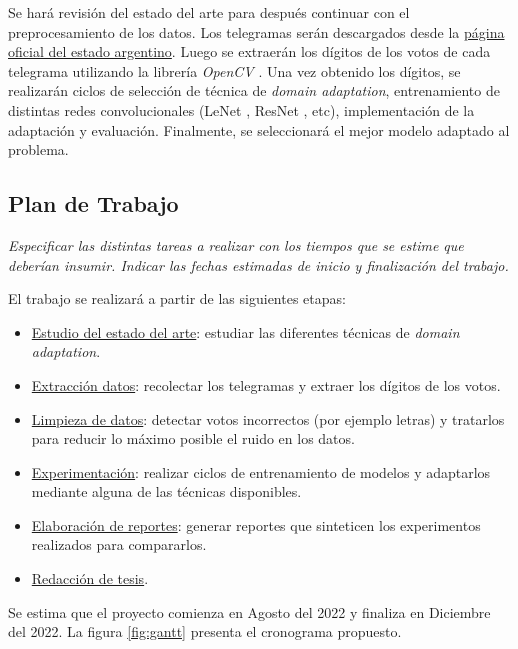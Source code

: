 \documentclass[a4paper, twoside]{report}
\begin{document}
Se har\'a revisi\'on del estado del arte para despu\'es continuar con el
preprocesamiento de los datos. Los telegramas ser\'an descargados desde la
\href{https://op.elecciones.gob.ar/telegramas/generales2021/}{p\'agina oficial
	del estado argentino}. Luego se extraer\'an los d\'igitos de los votos de cada
telegrama utilizando la librer\'ia {\it OpenCV} \cite{opencv_library}. Una vez
obtenido los d\'igitos, se realizar\'an ciclos de selecci\'on de t\'ecnica de
	{\it domain adaptation}, entrenamiento de distintas redes convolucionales
(LeNet \cite{lecun1998gradient}, ResNet \cite{he2016deep}, etc),
implementaci\'on de la adaptaci\'on y evaluaci\'on. Finalmente, se
seleccionar\'a el mejor modelo adaptado al problema.

\subsection*{Plan de Trabajo}
{\it Especificar las distintas tareas a realizar con los tiempos que se
	estime que deberían insumir.
	Indicar las fechas estimadas de inicio y finalización del trabajo.
}

El trabajo se realizar\'a a partir de las siguientes etapas:
\begin{itemize}
	\item \underline{Estudio del estado del arte}: estudiar las diferentes t\'ecnicas
	      de {\it domain adaptation}.
	\item \underline{Extracci\'on datos}: recolectar los telegramas
	      y extraer los d\'igitos de los votos.
	\item \underline{Limpieza de datos}: detectar votos incorrectos (por ejemplo
	      letras) y tratarlos para reducir lo m\'aximo posible el ruido
	      en los datos.
	\item \underline{Experimentaci\'on}: realizar ciclos de entrenamiento de modelos
	      y adaptarlos mediante alguna de las t\'ecnicas disponibles.
	\item \underline{Elaboraci\'on de reportes}: generar reportes que sinteticen los
	      experimentos realizados para compararlos.
	\item \underline{Redacci\'on de tesis}.
\end{itemize}

Se estima que el proyecto comienza en Agosto del 2022 y finaliza en Diciembre
del 2022. La figura \ref{fig:gantt} presenta el cronograma propuesto.
\end{document}
